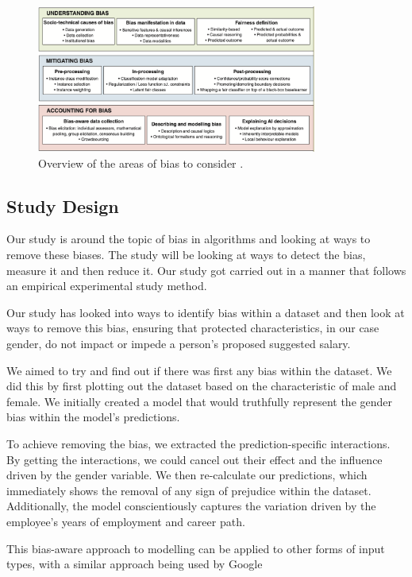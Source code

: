 \documentclass{sigchi}
\begin{document}
	\begin{figure}[h]
		\includegraphics[width=9.2cm]{bias_advice.png}
				\caption{Overview of the areas of bias to consider \cite{three}.} %
		\label{fig:bias_advice}
		\centering
	\end{figure}
	
	

\subsection{Study Design}
	Our study is around the topic of bias in algorithms and looking at ways to remove these biases. The study will be looking at ways to detect the bias, measure it and then reduce it. Our study got carried out in a manner that follows an empirical experimental study method. 

	Our study has looked into ways to identify bias within a dataset and then look at ways to remove this bias, ensuring that protected characteristics, in our case gender, do not impact or impede a person's proposed suggested salary.  

	We aimed to try and find out if there was first any bias within the dataset. We did this by first plotting out the dataset based on the characteristic of male and female. We initially created a model that would truthfully represent the gender bias within the model's predictions.

	To achieve removing the bias, we extracted the prediction-specific interactions. By getting the interactions, we could cancel out their effect and the influence driven by the gender variable. We then re-calculate our predictions, which immediately shows the removal of any sign of prejudice within the dataset. Additionally, the model conscientiously captures the variation driven by the employee's years of employment and career path. 

	This bias-aware approach to modelling can be applied to other forms of input types, with a similar approach being used by Google \cite{google_ref}
\end{document}
